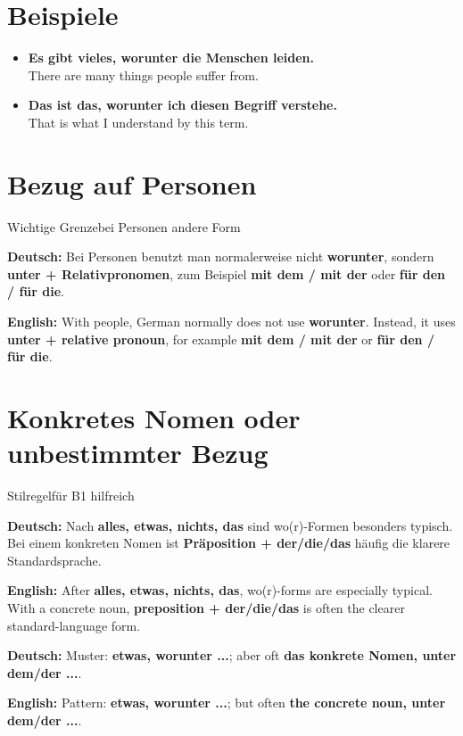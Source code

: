 \documentclass[a4paper,11pt]{article}
\newcommand{\GermanText}[1]{\textbf{Deutsch: }#1\par}
\newcommand{\EnglishText}[1]{{\small\color{SoftGray}\textbf{English: }#1\par}}
\newcommand{\ExampleItem}[2]{\item \textbf{#1}\\{\small\color{SoftGray}#2}}
\begin{document}
\section{Beispiele}

\begin{exbox}

\begin{itemize}

\ExampleItem{Es gibt vieles, worunter die Menschen leiden.}{There are many things people suffer from.}

\ExampleItem{Das ist das, worunter ich diesen Begriff verstehe.}{That is what I understand by this term.}

\end{itemize}

\end{exbox}

\section{Bezug auf Personen}

\begin{grammarentry}{Wichtige Grenze}{bei Personen andere Form}

\GermanText{Bei Personen benutzt man normalerweise nicht \textbf{worunter}, sondern \textbf{unter + Relativpronomen}, zum Beispiel \textbf{mit dem / mit der} oder \textbf{für den / für die}.}

\EnglishText{With people, German normally does not use \textbf{worunter}. Instead, it uses \textbf{unter + relative pronoun}, for example \textbf{mit dem / mit der} or \textbf{für den / für die}.}

\end{grammarentry}

\section{Konkretes Nomen oder unbestimmter Bezug}

\begin{grammarentry}{Stilregel}{für B1 hilfreich}

\GermanText{Nach \textbf{alles, etwas, nichts, das} sind wo(r)-Formen besonders typisch. Bei einem konkreten Nomen ist \textbf{Präposition + der/die/das} häufig die klarere Standardsprache.}

\EnglishText{After \textbf{alles, etwas, nichts, das}, wo(r)-forms are especially typical. With a concrete noun, \textbf{preposition + der/die/das} is often the clearer standard-language form.}

\GermanText{Muster: \textbf{etwas, worunter ...}; aber oft \textbf{das konkrete Nomen, unter dem/der ...}.}

\EnglishText{Pattern: \textbf{etwas, worunter ...}; but often \textbf{the concrete noun, unter dem/der ...}.}

\end{grammarentry}
\end{document}
